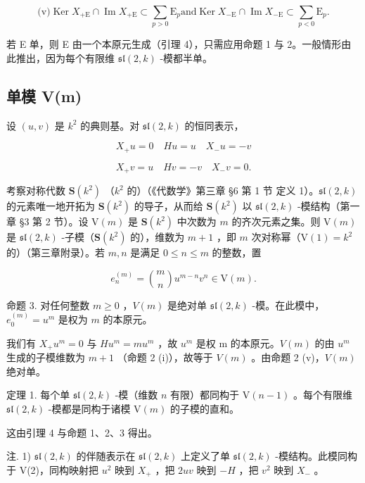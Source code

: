 \[
\text {(v)} \operatorname{Ker} X _ {+ \mathrm{E}} \cap \operatorname{Im} X _ {+ \mathrm{E}} \subset \sum_ {p > 0} \mathrm{E} _ {p} \text {and} \operatorname{Ker} X _ {- \mathrm{E}} \cap \operatorname{Im} X _ {- \mathrm{E}} \subset \sum_ {p <   0} \mathrm{E} _ {p}.
\]

若 E 单，则 E 由一个本原元生成（引理 4），只需应用命题 1 与 2。一般情形由此推出，因为每个有限维 \(\mathfrak{sl}(2,k)\) -模都半单。

\subsection{单模 V(m)}

设 \((u,v)\) 是 \(k^2\) 的典则基。对 \(\mathfrak{sl}(2,k)\) 的恒同表示，

\[
X _ {+} u = 0 \quad H u = u \quad X _ {-} u = - v
\]

\[
X _ {+} v = u \quad H v = - v \quad X _ {-} v = 0.
\]

考察对称代数 \(\mathbf{S}(k^2)\) （\(k^2\) 的）（《代数学》第三章 §6 第 1 节 定义 1）。\(\mathfrak{sl}(2,k)\) 的元素唯一地开拓为 \(\mathbf{S}(k^2)\) 的导子，从而给 \(\mathbf{S}(k^2)\) 以 \(\mathfrak{sl}(2,k)\) -模结构（第一章 §3 第 2 节）。设 \(\mathrm{V}(m)\) 是 \(\mathbf{S}(k^2)\) 中次数为 \(m\) 的齐次元素之集。则 \(\mathrm{V}(m)\) 是 \(\mathfrak{sl}(2,k)\) -子模（\(\mathbf{S}(k^2)\) 的），维数为 \(m + 1\) ，即 \(m\) 次对称幂（\(\mathrm{V}(1) = k^2\) 的）（第三章附录）。若 \(m,n\) 是满足 \(0 \leq n \leq m\) 的整数，置

\[
e _ {n} ^ {(m)} = \binom {m} {n} u ^ {m - n} v ^ {n} \in \mathrm{V} (m).
\]

命题 3. 对任何整数 \(m \geq 0\) ，\(V(m)\) 是绝对单 \(\mathfrak{sl}(2, k)\) -模。在此模中，\(e_0^{(m)} = u^m\) 是权为 \(m\) 的本原元。

我们有 \(X_{+}u^{m}=0\) 与 \(Hu^{m}=mu^{m}\) ，故 \(u^{m}\) 是权 m 的本原元。\(V(m)\) 的由 \(u^{m}\) 生成的子模维数为 \(m+1\) （命题 2 (i)），故等于 \(V(m)\) 。由命题 2 (v)，\(V(m)\) 绝对单。

定理 1. 每个单 \(\mathfrak{sl}(2,k)\) -模（维数 \(n\) 有限）都同构于 \(\mathrm{V}(n - 1)\) 。每个有限维 \(\mathfrak{sl}(2,k)\) -模都是同构于诸模 \(\mathrm{V}(m)\) 的子模的直和。

这由引理 4 与命题 1、2、3 得出。

注. 1) \(\mathfrak{sl}(2,k)\) 的伴随表示在 \(\mathfrak{sl}(2,k)\) 上定义了单 \(\mathfrak{sl}(2,k)\) -模结构。此模同构于 V(2)，同构映射把 \(u^2\) 映到 \(X_+\) ，把 \(2uv\) 映到 \(-H\) ，把 \(v^2\) 映到 \(X_-\) 。

